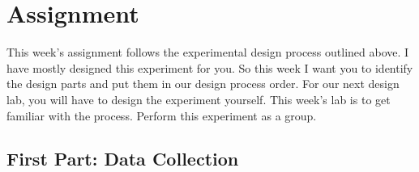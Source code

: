 \documentclass[twoside,11pt,ShortChapTitles]{BYUTextbook}
\begin{document}
\section{Assignment}

This week's assignment follows the experimental design process outlined above.
I have mostly designed this experiment for you. So this week I want you to
identify the design parts and put them in our design process order. For our
next design lab, you will have to design the experiment yourself. This week's
lab is to get familiar with the process. Perform this experiment as a group.

\subsection{First Part: Data Collection}
\end{document}
